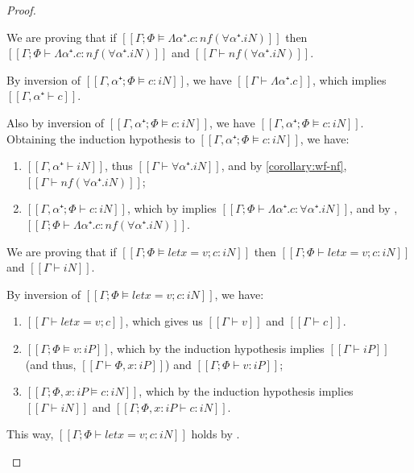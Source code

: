\begin{proof}
\begin{caseof}
        \item {}
            We are proving that if
            $[[Γ; Φ ⊨ Λα⁺ . c : nf(∀α⁺.iN)]]$
            then 
            $[[Γ ; Φ ⊢ Λα⁺ . c : nf(∀α⁺.iN)]]$
            and
            $[[Γ ⊢ nf(∀α⁺.iN)]]$.

            
            By inversion of $[[Γ, α⁺ ; Φ ⊨ c : iN]]$,
            we have $[[Γ ⊢ Λα⁺ . c]]$, which implies $[[Γ, α⁺ ⊢ c]]$.

            Also by inversion of 
            $[[Γ, α⁺ ; Φ ⊨ c : iN]]$, 
            we have $[[Γ, α⁺ ; Φ ⊨ c : iN]]$. 
            Obtaining the induction hypothesis to $[[Γ, α⁺ ; Φ ⊨ c : iN]]$,
            we have:
            \begin{enumerate}
                \item $[[Γ, α⁺ ⊢ iN]]$, thus $[[Γ ⊢ ∀α⁺.iN]]$,
                    and by \cref{corollary:wf-nf}, $[[Γ ⊢ nf(∀α⁺.iN)]]$;
                \item $[[Γ, α⁺ ; Φ ⊢ c : iN]]$, 
                    which by  implies
                    $[[Γ ; Φ ⊢ Λα⁺ . c : ∀α⁺.iN]]$, 
                    and by ,
                    $[[Γ ; Φ ⊢ Λα⁺ . c : nf(∀α⁺.iN)]]$.
            \end{enumerate}
            
        \item {}
            We are proving that if
            $[[Γ; Φ ⊨ let x = v ; c : iN]]$
            then
            $[[Γ ; Φ ⊢ let x = v ; c : iN]]$ and 
            $[[Γ ⊢ iN]]$.


            By inversion of 
            $[[Γ; Φ ⊨ let x = v ; c : iN]]$,
            we have:
            \begin{enumerate}
                \item $[[Γ ⊢ let x = v ; c]]$, which gives us 
            $[[Γ ⊢ v]]$ and $[[Γ ⊢ c]]$.
                \item $[[Γ; Φ ⊨ v : iP]]$, 
                    which by the induction hypothesis implies
                    $[[Γ ⊢ iP]]$ (and thus, $[[Γ ⊢ Φ, x:iP]]$) 
                    and $[[Γ; Φ ⊢ v : iP]]$; 
                \item $[[Γ; Φ, x:iP ⊨ c : iN]]$, 
                    which by the induction hypothesis implies
                    $[[Γ ⊢ iN]]$ and $[[Γ; Φ, x:iP ⊢ c : iN]]$.
            \end{enumerate}
            This way, 
            $[[Γ; Φ ⊢ let x = v ; c : iN]]$ holds by
            .


\end{caseof}
\end{proof}
